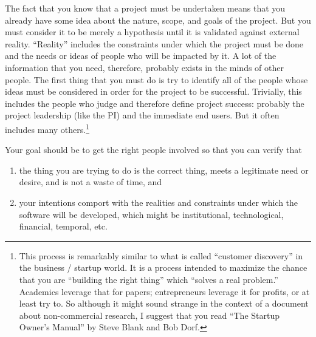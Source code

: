 \documentclass[12pt,oneside]{book}
\begin{document}
The fact that you know that a project must be undertaken means that you already have some idea about the nature, scope, and goals of the project. But you must consider it to be merely a hypothesis until it is validated against external reality. ``Reality'' includes the constraints under which the project must be done and the needs or ideas of people who will be impacted by it. A lot of the information that you need, therefore, probably exists in the minds of other people. The first thing that you must do is try to identify all of the people whose ideas must be considered in order for the project to be successful. Trivially, this includes the people who judge and therefore define project success: probably the project leadership (like the PI) and the immediate end users. But it often includes many others.\footnote{
This process is remarkably similar to what is called ``customer discovery'' in the business / startup world. It is a process intended to maximize the chance that you are ``building the right thing'' which ``solves a real problem.'' Academics leverage that for papers; entrepreneurs leverage it for profits, or at least try to. So although it might sound strange in the context of a document about non-commercial research, I suggest that you read ``The Startup Owner's Manual'' by Steve Blank and Bob Dorf.}

Your goal should be to get the right people involved so that you can verify that
\begin{enumerate}
\item the thing you are trying to do is the correct thing, meets a legitimate need or desire, and is not a waste of time, and 
\item your intentions comport with the realities and constraints under which the software will be developed, which might be institutional, technological, financial, temporal, etc.
\end{enumerate}
\end{document}
